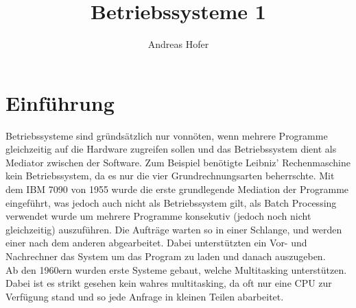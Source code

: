 \documentclass{article}
\title{\vspace{-1cm}Betriebssysteme 1}
\author{Andreas Hofer}
\begin{document}
	\maketitle
	\tableofcontents
	\newpage
	\section{Einführung}
	Betriebssysteme sind gründsätzlich nur vonnöten, wenn mehrere Programme gleichzeitig auf die Hardware zugreifen sollen und das Betriebssystem dient als Mediator zwischen der Software. Zum Beispiel benötigte Leibniz' Rechenmaschine kein Betriebssystem, da es nur die vier Grundrechnungsarten beherrschte. Mit dem IBM 7090 von 1955 wurde die erste grundlegende Mediation der Programme eingeführt, was jedoch auch nicht als Betriebssystem gilt, als Batch Processing verwendet wurde um mehrere Programme konsekutiv (jedoch noch nicht gleichzeitig) auszuführen. Die Aufträge warten so in einer Schlange, und werden einer nach dem anderen abgearbeitet. Dabei unterstützten ein Vor- und Nachrechner das System um das Program zu laden und danach auszugeben. \\
	Ab den 1960ern wurden erste Systeme gebaut, welche Multitasking unterstützen. Dabei ist es strikt gesehen kein wahres multitasking, da oft nur eine CPU zur Verfügung stand und so jede Anfrage in kleinen Teilen abarbeitet. 
\end{document}
